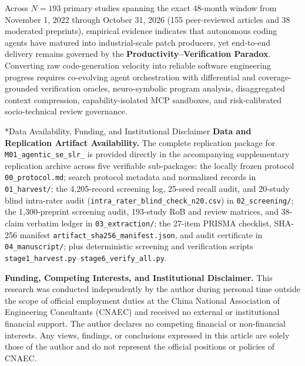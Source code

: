 \documentclass[10pt,twocolumn,a4paper]{article}
\makeatletter
\renewcommand\section{\@startsection{section}{1}{\z@}{-2.8ex \@plus -0.6ex \@minus -0.2ex}{1.4ex \@plus 0.2ex}{\normalfont\Large\bfseries\raggedright}}
\makeatother
\begin{document}
\section{Conclusion}
\label{sec:conclusion}

Across $N = 193$ primary studies spanning the exact 48-month window from November 1, 2022 through October 31, 2026 (155 peer-reviewed articles and 38 moderated preprints), empirical evidence indicates that autonomous coding agents have matured into industrial-scale patch producers, yet end-to-end delivery remains governed by the \textbf{Productivity--Verification Paradox}. Converting raw code-generation velocity into reliable software engineering progress requires co-evolving agent orchestration with differential and coverage-grounded verification oracles, neuro-symbolic program analysis, disaggregated context compression, capability-isolated MCP sandboxes, and risk-calibrated socio-technical review governance.

\section*{Data Availability, Funding, and Institutional Disclaimer}
\textbf{Data and Replication Artifact Availability.} The complete replication package for \texttt{M01\_\allowbreak agentic\_\allowbreak se\_\allowbreak slr\_} is provided directly in the accompanying supplementary replication archive across five verifiable sub-packages: the locally frozen protocol \texttt{00\_protocol.md}; search protocol metadata and normalized records in \texttt{01\_harvest/}; the 4,205-record screening log, 25-seed recall audit, and 20-study blind intra-rater audit (\texttt{intra\_\allowbreak rater\_\allowbreak blind\_\allowbreak check\_\allowbreak n20.\allowbreak csv}) in \texttt{02\_screening/}; the 1,300-preprint screening audit, 193-study RoB and review matrices, and 38-claim verbatim ledger in \texttt{03\_extraction/}; the 27-item PRISMA checklist, SHA-256 manifest \texttt{artifact\_\allowbreak sha256\_\allowbreak manifest.\allowbreak json}, and audit certificate in \texttt{04\_manuscript/}; plus deterministic screening and verification scripts \texttt{stage1\_harvest.py}--\texttt{stage6\_verify\_all.py}.

\textbf{Funding, Competing Interests, and Institutional Disclaimer.} This research was conducted independently by the author during personal time outside the scope of official employment duties at the China National Association of Engineering Consultants (CNAEC) and received no external or institutional financial support. The author declares no competing financial or non-financial interests. Any views, findings, or conclusions expressed in this article are solely those of the author and do not represent the official positions or policies of CNAEC.
\end{document}
